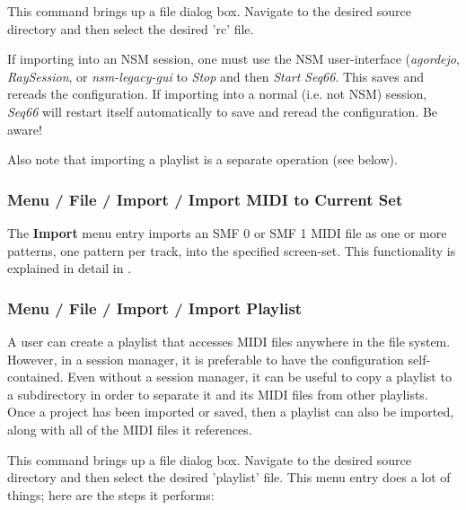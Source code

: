    This command brings up a file dialog box. Navigate to the desired
   source directory and then select the desired 'rc' file.

   If importing into an NSM session, one must use the NSM user-interface
   (\textsl{agordejo}, \textsl{RaySession}, or \textsl{nsm-legacy-gui}
   to \textsl{Stop} and then \textsl{Start} \textsl{Seq66}.
   This saves and rereads the configuration.
   If importing into a normal (i.e. not NSM) session, \textsl{Seq66} will
   restart itself automatically to save and reread the configuration.
   Be aware!

   Also note that importing a playlist is a separate operation (see
   below).

\subsubsection{Menu / File / Import / Import MIDI to Current Set}
\label{subsubsec:menu_file_import}

   The \textbf{Import} menu entry imports an SMF 0
   or SMF 1 MIDI file as one or more patterns, one pattern per track,
   into the specified screen-set.
   This functionality is explained in detail in
   .

\subsubsection{Menu / File / Import / Import Playlist}
\label{subsubsec:menu_file_import_playlisMIDI to Current Sett}

   A user can create a playlist that accesses MIDI files anywhere in the file
   system.
   However, in a session manager, it is preferable to have the configuration
   self-contained.
   Even without a session manager, it can be useful to copy a playlist to a
   subdirectory in order to separate it and its MIDI files from other
   playlists.
   Once a project has been imported or saved, then a playlist can also be
   imported, along with all of the MIDI files it references.

   This command brings up a file dialog box. Navigate to the desired
   source directory and then select the desired 'playlist' file.
   This menu entry does a lot of things; here are the steps it performs:

